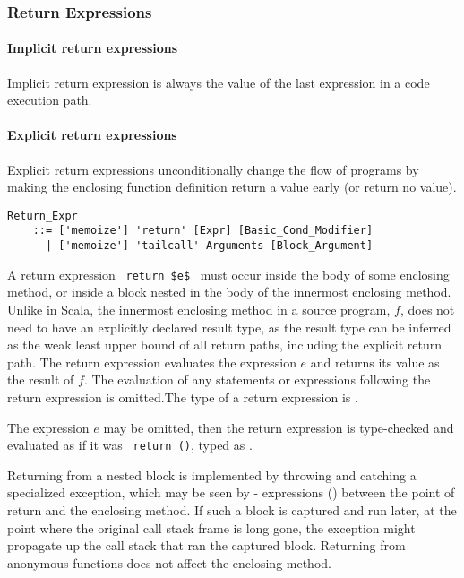 \subsubsection{Return Expressions}
\label{sec:return-expressions}

\paragraph{Implicit return expressions}
Implicit return expression is always the value of the last expression in a code execution path. 

\paragraph{Explicit return expressions}
Explicit return expressions unconditionally change the flow of programs by making the enclosing function definition return a value early (or return no value). 

\grammar\begin{lstlisting}
Return_Expr 
    ::= ['memoize'] 'return' [Expr] [Basic_Cond_Modifier]
      | ['memoize'] 'tailcall' Arguments [Block_Argument]
\end{lstlisting}

A return expression ~\lstinline!return $e$!~ must occur inside the body of some enclosing method, or inside a block nested in the body of the innermost enclosing method. Unlike in Scala, the innermost enclosing method in a source program, $f$, does not need to have an explicitly declared result type, as the result type can be inferred as the weak least upper bound of all return paths, including the explicit return path. The return expression evaluates the expression $e$ and returns its value as the result of $f$. The evaluation of any statements or expressions following the return expression is omitted.The type of a return expression is .

The expression $e$ may be omitted, then the return expression  is type-checked and evaluated as if it was ~\lstinline!return ()!, typed as . 

Returning from a nested block is implemented by throwing and catching a specialized exception, which may be seen by - expressions () between the point of return and the enclosing method. If such a block is captured and run later, at the point where the original call stack frame is long gone, the exception might propagate up the call stack that ran the captured block. Returning from anonymous functions does not affect the enclosing method. 

